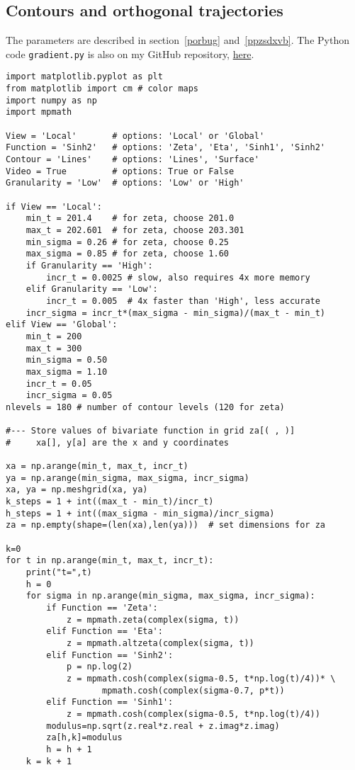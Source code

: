 \documentclass[oneside,10pt]{book}
\begin{document}
\subsection{Contours and orthogonal trajectories}\label{iudwlmn}

The parameters are described in section~\ref{porbug} and~\ref{ppzsdxvb}. The Python code \texttt{gradient.py} is also on my
GitHub repository, \href{https://github.com/VincentGranville/Experimental-Math-Number-Theory/blob/main/Source-Code/gradient.py}{here}. \vspace{1ex}

\begin{lstlisting}
import matplotlib.pyplot as plt
from matplotlib import cm # color maps
import numpy as np
import mpmath

View = 'Local'       # options: 'Local' or 'Global'
Function = 'Sinh2'   # options: 'Zeta', 'Eta', 'Sinh1', 'Sinh2'
Contour = 'Lines'    # options: 'Lines', 'Surface'
Video = True         # options: True or False
Granularity = 'Low'  # options: 'Low' or 'High'

if View == 'Local':
    min_t = 201.4    # for zeta, choose 201.0
    max_t = 202.601  # for zeta, choose 203.301
    min_sigma = 0.26 # for zeta, choose 0.25
    max_sigma = 0.85 # for zeta, choose 1.60
    if Granularity == 'High':
        incr_t = 0.0025 # slow, also requires 4x more memory
    elif Granularity == 'Low':
        incr_t = 0.005  # 4x faster than 'High', less accurate
    incr_sigma = incr_t*(max_sigma - min_sigma)/(max_t - min_t)
elif View == 'Global':
    min_t = 200
    max_t = 300
    min_sigma = 0.50
    max_sigma = 1.10
    incr_t = 0.05
    incr_sigma = 0.05
nlevels = 180 # number of contour levels (120 for zeta)

#--- Store values of bivariate function in grid za[( , )]
#     xa[], y[a] are the x and y coordinates

xa = np.arange(min_t, max_t, incr_t)
ya = np.arange(min_sigma, max_sigma, incr_sigma)
xa, ya = np.meshgrid(xa, ya)
k_steps = 1 + int((max_t - min_t)/incr_t)
h_steps = 1 + int((max_sigma - min_sigma)/incr_sigma)
za = np.empty(shape=(len(xa),len(ya)))  # set dimensions for za

k=0
for t in np.arange(min_t, max_t, incr_t):
    print("t=",t)
    h = 0
    for sigma in np.arange(min_sigma, max_sigma, incr_sigma):
        if Function == 'Zeta':
            z = mpmath.zeta(complex(sigma, t))
        elif Function == 'Eta':
            z = mpmath.altzeta(complex(sigma, t))
        elif Function == 'Sinh2':
            p = np.log(2)
            z = mpmath.cosh(complex(sigma-0.5, t*np.log(t)/4))* \
                   mpmath.cosh(complex(sigma-0.7, p*t))
        elif Function == 'Sinh1':
            z = mpmath.cosh(complex(sigma-0.5, t*np.log(t)/4))
        modulus=np.sqrt(z.real*z.real + z.imag*z.imag)
        za[h,k]=modulus
        h = h + 1
    k = k + 1


\end{lstlisting}
\end{document}

